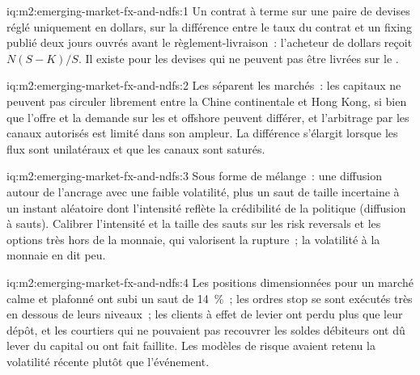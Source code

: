\begin{solution}{iq:m2:emerging-market-fx-and-ndfs:1}
Un contrat à terme sur une paire de devises réglé uniquement en dollars, sur la différence entre
le taux du contrat et un fixing publié deux jours ouvrés avant le règlement-livraison~:
l'acheteur de dollars reçoit $N(S-K)/S$. Il existe pour les devises qui ne peuvent pas être
livrées sur le .
\end{solution}

\begin{solution}{iq:m2:emerging-market-fx-and-ndfs:2}
Les  séparent les marchés~: les capitaux ne peuvent pas circuler librement entre
la Chine continentale et Hong Kong, si bien que l'offre et la demande sur les  et offshore peuvent
différer, et l'arbitrage par les canaux autorisés est limité dans son ampleur. La
différence s'élargit lorsque les flux sont unilatéraux et que les canaux sont saturés.
\end{solution}

\begin{solution}{iq:m2:emerging-market-fx-and-ndfs:3}
Sous forme de mélange~: une diffusion autour de l'ancrage avec une faible volatilité, plus un saut de
taille incertaine à un instant aléatoire dont l'intensité reflète la
crédibilité de la politique (diffusion à sauts). Calibrer l'intensité et la taille des sauts sur les
risk reversals et les options très hors de la monnaie, qui valorisent la rupture~; la volatilité à la monnaie
en dit peu.
\end{solution}

\begin{solution}{iq:m2:emerging-market-fx-and-ndfs:4}
Les positions dimensionnées pour un marché calme et plafonné ont subi un saut de 14~\%~; les ordres stop
se sont exécutés très en dessous de leurs niveaux~; les clients à effet de levier ont perdu plus que leur dépôt, et les courtiers qui
ne pouvaient pas recouvrer les soldes débiteurs ont dû lever du capital ou ont fait faillite. Les modèles de risque
avaient retenu la volatilité récente plutôt que l'événement.
\end{solution}

